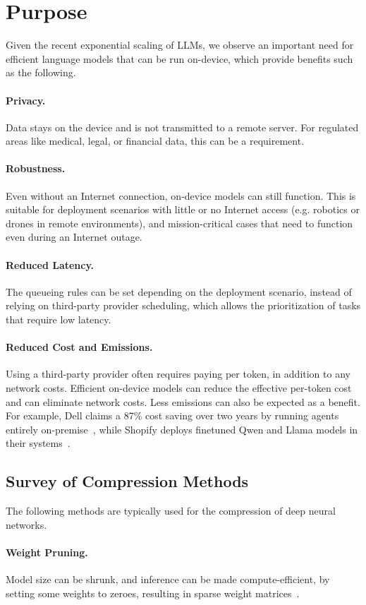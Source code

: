 \documentclass[../main.tex]{subfiles}
\begin{document}
\section{Purpose}
Given the recent exponential scaling of LLMs, we observe an important need for efficient language models that can be run on-device, which provide benefits such as the following.

\paragraph{Privacy.} Data stays on the device and is not transmitted to a remote server. For regulated areas like medical, legal, or financial data, this can be a requirement.
\paragraph{Robustness.} Even without an Internet connection, on-device models can still function. This is suitable for deployment scenarios with little or no Internet access (e.g. robotics or drones in remote environments), and mission-critical cases that need to function even during an Internet outage.
\paragraph{Reduced Latency.} The queueing rules can be set depending on the deployment scenario, instead of relying on third-party provider scheduling, which allows the prioritization of tasks that require low latency.
\paragraph{Reduced Cost and Emissions.} Using a third-party provider often requires paying per token, in addition to any network costs. Efficient on-device models can reduce the effective per-token cost and can eliminate network costs. Less emissions can also be expected as a benefit. For example, Dell claims a 87\% cost saving over two years by running agents entirely on-premise~\cite{tanAICostsSpiral}, while Shopify deploys finetuned Qwen and Llama models in their systems~\cite{javierAugmentedCommerceMachine}.

\subsection{Survey of Compression Methods}
The following methods are typically used for the compression of deep neural networks.
\paragraph{Weight Pruning.} Model size can be shrunk, and inference can be made compute-efficient, by setting some weights to zeroes, resulting in sparse weight matrices~\cite{wangStructuredPruningLarge2020a}.
\end{document}
